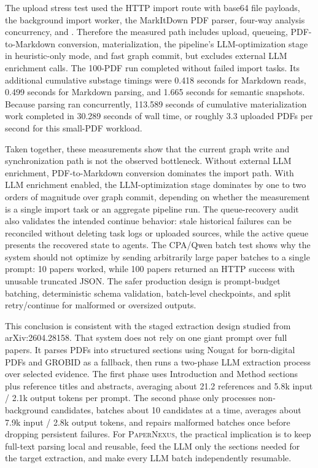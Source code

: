 \documentclass[11pt]{article}
\newcommand{\papernexus}{\textsc{PaperNexus}}
\newcommand{\code}[1]{\texttt{\detokenize{#1}}}
\begin{document}
The upload stress test used the HTTP import route with base64 file payloads, the background import worker, the MarkItDown PDF parser, four-way analysis concurrency, and \code{semanticExtraction=heuristic-only}. Therefore the measured path includes upload, queueing, PDF-to-Markdown conversion, materialization, the pipeline's LLM-optimization stage in heuristic-only mode, and fast graph commit, but excludes external LLM enrichment calls. The 100-PDF run completed without failed import tasks. Its additional cumulative substage timings were 0.418 seconds for Markdown reads, 0.499 seconds for Markdown parsing, and 1.665 seconds for semantic snapshots. Because parsing ran concurrently, 113.589 seconds of cumulative materialization work completed in 30.289 seconds of wall time, or roughly 3.3 uploaded PDFs per second for this small-PDF workload.

Taken together, these measurements show that the current graph write and synchronization path is not the observed bottleneck. Without external LLM enrichment, PDF-to-Markdown conversion dominates the import path. With LLM enrichment enabled, the LLM-optimization stage dominates by one to two orders of magnitude over graph commit, depending on whether the measurement is a single import task or an aggregate pipeline run. The queue-recovery audit also validates the intended continue behavior: stale historical failures can be reconciled without deleting task logs or uploaded sources, while the active queue presents the recovered state to agents. The CPA/Qwen batch test shows why the system should not optimize by sending arbitrarily large paper batches to a single prompt: 10 papers worked, while 100 papers returned an HTTP success with unusable truncated JSON. The safer production design is prompt-budget batching, deterministic schema validation, batch-level checkpoints, and split retry/continue for malformed or oversized outputs.

This conclusion is consistent with the staged extraction design studied from arXiv:2604.28158. That system does not rely on one giant prompt over full papers. It parses PDFs into structured sections using Nougat for born-digital PDFs and GROBID as a fallback, then runs a two-phase LLM extraction process over selected evidence. The first phase uses Introduction and Method sections plus reference titles and abstracts, averaging about 21.2 references and 5.8k input / 2.1k output tokens per prompt. The second phase only processes non-background candidates, batches about 10 candidates at a time, averages about 7.9k input / 2.8k output tokens, and repairs malformed batches once before dropping persistent failures. For \papernexus{}, the practical implication is to keep full-text parsing local and reusable, feed the LLM only the sections needed for the target extraction, and make every LLM batch independently resumable.
\end{document}
